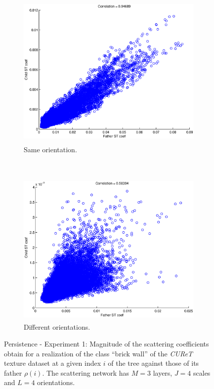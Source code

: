 \documentclass[a4paper,11pt]{report}
\begin{document}
		\begin{figure}[h]
				\begin{center}
					\begin{subfigure}[t]{0.48\textwidth}
						\centering
						\includegraphics[height=3in]{persist_uiuc_layer2-3_highCor.eps}
						\caption{Same orientation.}%
						\label{subfig:same orientation}
					\end{subfigure}%
					~
					\begin{subfigure}[t]{0.48\textwidth}
						\centering
						\includegraphics[height=3in]{persist_uiuc_layer2-3_lowCor.eps}
						\caption{Different orientations.} %
						\label{subfig:dif orientation}
					\end{subfigure}%
					\caption[Persistence - Experiment 1.]{\centering Persistence - Experiment 1: Magnitude of the scattering coefficients obtain for a realization of the class ``brick wall'' of the \textit{CUReT} texture dataset at a given index $i$ of the tree against those of its father $\rho(i)$. The scattering network has $M=3$ layers, $J=4$ scales and $L=4$ orientations.}
					\label{fig:Persistence - 1}
				\end{center}
		\end{figure} 
\end{document}
